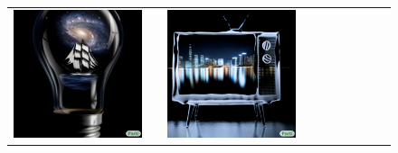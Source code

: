 \begin{figure}[ht!]
\begin{adjustwidth}{-0.8in}{-0.5in}  
    \centering                     
    \footnotesize
\setlength\tabcolsep{1pt}
\vspace{-0.2in}
\begin{tabular}{cccccccccccccccccccc}
\multicolumn{6}{c}{\includegraphics[width=\thirdcolwidth\textwidth]{figures/cherries/sailing.jpg}} &&
\multicolumn{6}{c}{\includegraphics[width=\thirdcolwidth\textwidth]{figures/cherries/water_tv_city.jpg}} &&

\end{tabular}
\end{adjustwidth}
\end{figure}
